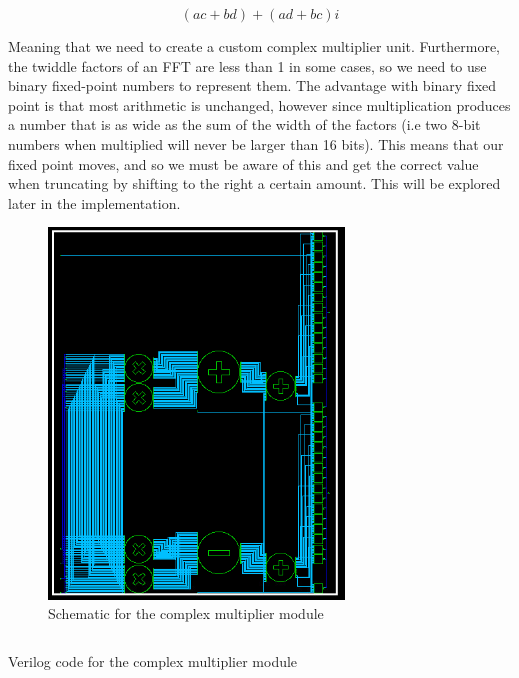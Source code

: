 \documentclass[12pt]{article}
\begin{document}
\begin{equation*}
	(ac + bd) + (ad + bc)i
\end{equation*}

Meaning that we need to create a custom complex multiplier unit. Furthermore,
the twiddle factors of an FFT are less than 1 in some cases, so we need to use
binary fixed-point numbers to represent them. The advantage with binary fixed
point is that most arithmetic is unchanged, however since multiplication
produces a number that is as wide as the sum of the width of the factors (i.e
two 8-bit numbers when multiplied will never be larger than 16 bits). This
means that our fixed point moves, and so we must be aware of this and get the
correct value when truncating by shifting to the right a certain amount. This
will be explored later in the implementation.

\begin{figure}[H]
	\includegraphics[width=0.7\textwidth]{cplx_schematic.png}
	\centering
	\caption{Schematic for the complex multiplier module}
	\label{fig:cplx_schem}
\end{figure}

\begin{listing}[H]
	\inputminted[frame=lines]{verilog}{../rtl/cplx_mul.v}
\caption{Verilog code for the complex multiplier module}
\label{list:cplx_mul_v}
\end{listing}
\end{document}
